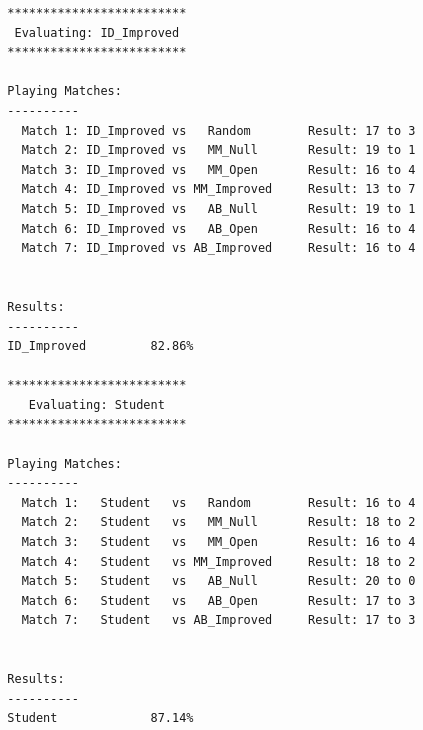 \documentclass{article}
\begin{document}
\begin{verbatim}
  *************************
   Evaluating: ID_Improved
  *************************

  Playing Matches:
  ----------
    Match 1: ID_Improved vs   Random    	Result: 17 to 3
    Match 2: ID_Improved vs   MM_Null   	Result: 19 to 1
    Match 3: ID_Improved vs   MM_Open   	Result: 16 to 4
    Match 4: ID_Improved vs MM_Improved 	Result: 13 to 7
    Match 5: ID_Improved vs   AB_Null   	Result: 19 to 1
    Match 6: ID_Improved vs   AB_Open   	Result: 16 to 4
    Match 7: ID_Improved vs AB_Improved 	Result: 16 to 4


  Results:
  ----------
  ID_Improved         82.86%

  *************************
     Evaluating: Student
  *************************

  Playing Matches:
  ----------
    Match 1:   Student   vs   Random    	Result: 16 to 4
    Match 2:   Student   vs   MM_Null   	Result: 18 to 2
    Match 3:   Student   vs   MM_Open   	Result: 16 to 4
    Match 4:   Student   vs MM_Improved 	Result: 18 to 2
    Match 5:   Student   vs   AB_Null   	Result: 20 to 0
    Match 6:   Student   vs   AB_Open   	Result: 17 to 3
    Match 7:   Student   vs AB_Improved 	Result: 17 to 3


  Results:
  ----------
  Student             87.14%
\end{verbatim}
\end{document}
